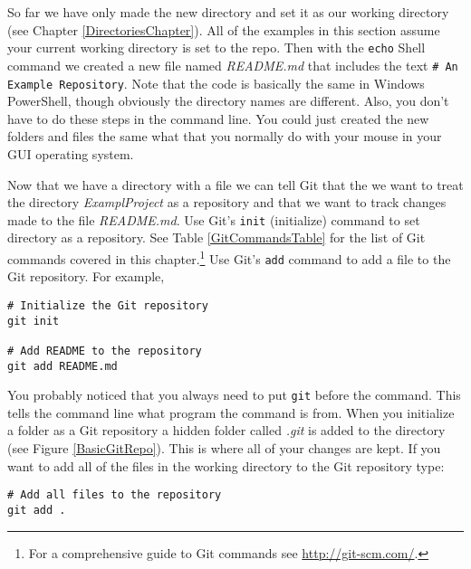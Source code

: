 \noindent So far we have only made the new directory and set it as our working directory (see Chapter \ref{DirectoriesChapter}). All of the examples in this section assume your current working directory is set to the repo. Then with the \texttt{echo} Shell command we created a new file named {\emph{README.md}} that includes the text \verb|# An Example Repository|. Note that the code is basically the same in Windows PowerShell, though obviously the directory names are different. Also, you don't have to do these steps in the command line. You could just created the new folders and files the same what that you normally do with your mouse in your GUI operating system.

Now that we have a directory with a file we can tell Git that the we want to treat the directory {\emph{ExamplProject}} as a repository and that we want to track changes made to the file {\emph{README.md}}. Use Git's \texttt{init} (initialize) command to set directory as a repository. See Table \ref{GitCommandsTable} for the list of Git commands covered in this chapter.\footnote{For a comprehensive guide to Git commands see \url{http://git-scm.com/}.} Use Git's \texttt{add} command to add a file to the Git repository. For example, 

\begin{knitrout}
\color{fgcolor}\begin{kframe}
\begin{verbatim}
# Initialize the Git repository
git init

# Add README to the repository
git add README.md
\end{verbatim}
\end{kframe}
\end{knitrout}


\noindent You probably noticed that you always need to put \texttt{git} before the command. This tells the command line what program the command is from. When you initialize a folder as a Git repository a hidden folder called {\emph{.git}} is added to the directory (see Figure \ref{BasicGitRepo}). This is where all of your changes are kept. If you want to add all of the files in the working directory to the Git repository type:

\begin{knitrout}
\color{fgcolor}\begin{kframe}
\begin{verbatim}
# Add all files to the repository
git add .
\end{verbatim}
\end{kframe}
\end{knitrout}



